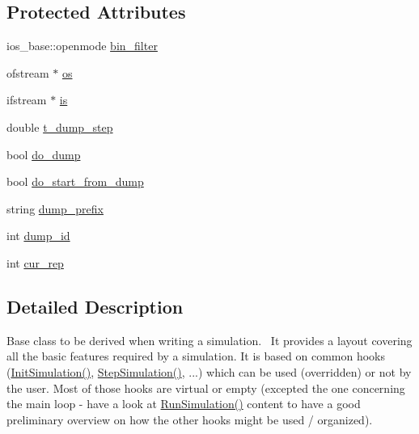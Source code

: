 \subsection*{Protected Attributes}
\begin{DoxyCompactItemize}
\item 
ios\+\_\+base\+::openmode \hyperlink{classelps_1_1_lab_simulator_base_abf50d59bc986d5fd60cf0736da6d7cfc}{bin\+\_\+filter}
\item 
ofstream $\ast$ \hyperlink{classelps_1_1_lab_simulator_base_a799acaededd6716893242514ee55f2be}{os}
\item 
ifstream $\ast$ \hyperlink{classelps_1_1_lab_simulator_base_a3c2edadc7f9844cc4761c0aaa187a055}{is}
\item 
double \hyperlink{classelps_1_1_lab_simulator_base_aa259e227b74c8af7336ec106151eb8e6}{t\+\_\+dump\+\_\+step}
\item 
bool \hyperlink{classelps_1_1_lab_simulator_base_ac66d131d494c485ea584bf6421a4066a}{do\+\_\+dump}
\item 
bool \hyperlink{classelps_1_1_lab_simulator_base_ade3a639ae5152292e8d15a0e8cf057d0}{do\+\_\+start\+\_\+from\+\_\+dump}
\item 
string \hyperlink{classelps_1_1_lab_simulator_base_aa3b09013a555da1f89fa88861612a9ae}{dump\+\_\+prefix}
\item 
int \hyperlink{classelps_1_1_lab_simulator_base_a95e1ab73336c28b76439709ad4bfa29a}{dump\+\_\+id}
\item 
int \hyperlink{classelps_1_1_lab_simulator_base_af44ecd9b5e3946131bac9e735233502b}{cur\+\_\+rep}
\end{DoxyCompactItemize}


\subsection{Detailed Description}
Base class to be derived when writing a simulation.~\newline
 It provides a layout covering all the basic features required by a simulation. It is based on common hooks (\hyperlink{classelps_1_1_lab_simulator_base_aa14aa05df8173ffd2a2e67aa25f3cea5}{Init\+Simulation()}, \hyperlink{classelps_1_1_lab_simulator_base_ab48b05171894c3405e6865e019774106}{Step\+Simulation()}, ...) which can be used (overridden) or not by the user. Most of those hooks are virtual or empty (excepted the one concerning the main loop -\/ have a look at \hyperlink{classelps_1_1_lab_simulator_base_ab48e943c2b85b25ff96b2aab4d9aa4bd}{Run\+Simulation()} content to have a good preliminary overview on how the other hooks might be used / organized).

